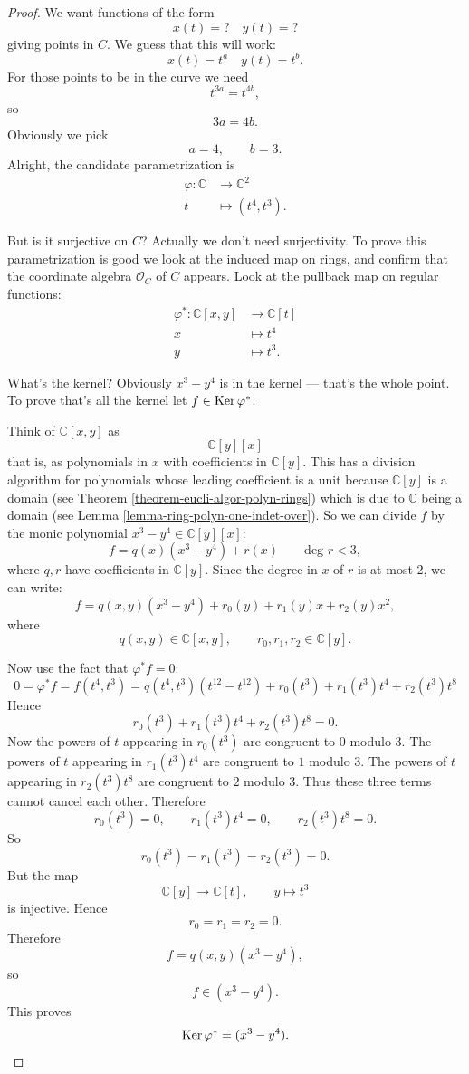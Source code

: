 \begin{proof}
We want functions of the form
$$
x(t)=? \quad  y(t)=?
$$
giving points in $C$.
We guess that this will work:
$$
x(t)=t^a \quad  y(t)=t^b.
$$
For those points to be in the curve we need
$$
t^{3a} = t^{4b},
$$
so
$$
3a=4b.
$$
Obviously we pick
$$
a=4,\qquad b=3.
$$
Alright, the candidate parametrization is
$$
\begin{aligned}
\varphi: \mathbb{C} &\longrightarrow
\mathbb{C}^2 \\
t &\longmapsto (t^4,t^3).
\end{aligned}
$$

\noindent
But is it surjective on $C$?
Actually we don't need surjectivity.
To prove this parametrization is good
we look at the induced map on rings,
and confirm that the coordinate algebra
$\mathcal{O}_C$ of $C$ appears.
Look at the pullback
map on regular functions:
$$
\begin{aligned}
\varphi^*: \mathbb{C}[x,y] 
&\longrightarrow \mathbb{C}[t] \\
x &\longmapsto t^4\\
y &\longmapsto t^3.
\end{aligned}
$$

\noindent
What's the kernel? Obviously
$x^3-y^4$ is in the kernel --- that's
the whole point. To prove that's all
the kernel let $f \in \mathop{\mathrm{Ker}} \varphi^*$.

Think of $\mathbb{C}[x,y]$
as
$$
\mathbb{C}[y][x]
$$
that is, as polynomials in $x$
with coefficients in $\mathbb{C}[y]$.
This has a division algorithm
for polynomials whose leading
coefficient is a unit
because $\mathbb{C}[y]$ is a domain
(see Theorem
\ref{theorem-eucli-algor-polyn-rings})
which is due to $\mathbb{C}$
being a domain
(see Lemma
\ref{lemma-ring-polyn-one-indet-over}).
So we can divide $f$ by
the monic polynomial $x^3 - y^4 
\in \mathbb{C}[y][x]$:
$$
f = q(x)(x^3-y^4) + r(x)
\qquad \text{deg }r < 3,
$$
where $q,r$ have coefficients in 
$\mathbb{C}[y]$. Since the degree
in $x$ of $r$ is at most 2, we can
write:
$$
f
=
q(x,y)(x^3-y^4)
+
r_0(y)+r_1(y)x+r_2(y)x^2,
$$
where
$$
q(x,y)\in \mathbb C[x,y],
\qquad
r_0,r_1,r_2\in \mathbb C[y].
$$

Now use the fact that $\varphi^*f=0$:
$$
0=\varphi^*f=f(t^4,t^3)
=q(t^4,t^3)(t^{12}-t^{12}) 
+ r_0(t^3)
+r_1(t^3)t^4
+r_2(t^3)t^8
$$
Hence
$$
r_0(t^3)+r_1(t^3)t^4+r_2(t^3)t^8=0.
$$
Now the powers of $t$ appearing in
$r_0(t^3)$ are congruent to $0$ modulo $3$.
The powers of $t$ appearing in
$r_1(t^3)t^4$ are congruent to $1$ modulo $3$.
The powers of $t$ appearing in
$r_2(t^3)t^8$ are congruent to $2$ modulo $3$.
Thus these three terms cannot cancel each
other. Therefore
$$
r_0(t^3)=0,\qquad
r_1(t^3)t^4=0,\qquad
r_2(t^3)t^8=0.
$$
So
$$
r_0(t^3)=r_1(t^3)=r_2(t^3)=0.
$$
But the map
$$
\mathbb C[y]\longrightarrow \mathbb C[t],
\qquad
y\longmapsto t^3
$$
is injective. Hence
$$
r_0=r_1=r_2=0.
$$
Therefore
$$
f=q(x,y)(x^3-y^4),
$$
so
$$
f\in (x^3-y^4).
$$
This proves
$$
\mathop{\mathrm{Ker}}\varphi^*=(x^3-y^4).
$$



\end{proof}

